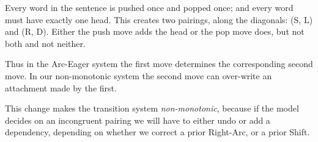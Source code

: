 \documentclass[11pt,letterpaper]{article}
\newcommand{\maybe}[1]{\textcolor{gray}{#1}}
\begin{document}
Every word in the sentence is pushed once and popped once; and every
word must have exactly one head. This creates two pairings, along the
diagonals: (S, L) and (R, D).
Either the push move adds the head or the pop move does, but not both and not neither.

Thus in the Arc-Eager system the first move determines the corresponding second move.
In our non-monotonic system the second move can over-write an attachment made
by the first.

This change makes the transition system \emph{non-monotonic}, because if the model decides
on an incongruent pairing
we will have to either undo or add a
dependency, depending on whether we correct a prior Right-Arc, or a prior Shift.


\end{document}
